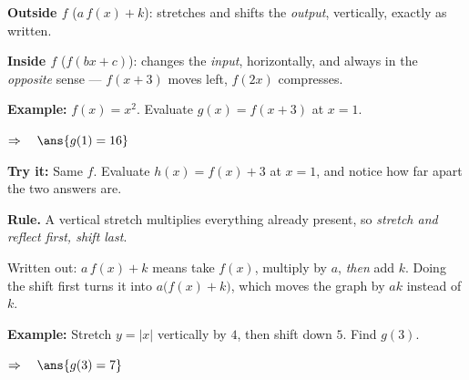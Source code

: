 \documentclass[12pt]{article}
\begin{document}


\begin{formulabox}
\textbf{Outside $f$} ($a\,f(x) + k$): stretches and shifts the \emph{output}, vertically, exactly as written.\par
\textbf{Inside $f$} ($f(bx + c)$): changes the \emph{input}, horizontally, and always in the \emph{opposite} sense --- $f(x+3)$ moves left, $f(2x)$ compresses.
\end{formulabox}

\begin{examplebox}
\textbf{Example:} \quad $f(x) = x^{2}$. Evaluate $g(x) = f(x + 3)$ at $x = 1$.

$\Rightarrow\quad \ans{g(1) = 16}$
\end{examplebox}

\begin{tryitbox}
\textbf{Try it:} \quad Same $f$. Evaluate $h(x) = f(x) + 3$ at $x = 1$, and notice how far apart the two answers are.\\[2pt]
\end{tryitbox}


\begin{formulabox}
\textbf{Rule.} A vertical stretch multiplies everything already present, so \emph{stretch and reflect first, shift last}.\par
Written out: $a\,f(x) + k$ means take $f(x)$, multiply by $a$, \emph{then} add $k$. Doing the shift first turns it into $a\bigl(f(x) + k\bigr)$, which moves the graph by $ak$ instead of $k$.
\end{formulabox}

\begin{examplebox}
\textbf{Example:} \quad Stretch $y = |x|$ vertically by $4$, then shift down $5$. Find $g(3)$.

$\Rightarrow\quad \ans{g(3) = 7}$
\end{examplebox}
\end{document}
